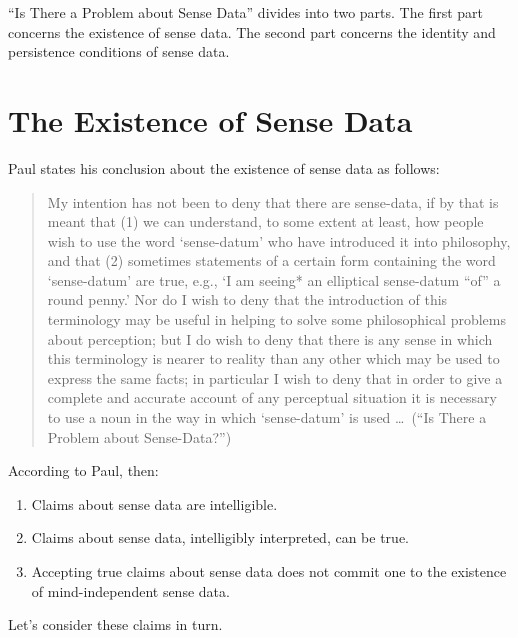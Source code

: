 \documentclass[11pt]{article}
\begin{document}



``Is There a Problem about Sense Data'' divides into two parts. The first part concerns the existence of sense data. The second part concerns the identity and persistence conditions of sense data.

\section{The Existence of Sense Data} %
\label{sec:the_existence_of_sense_data}

Paul states his conclusion about the existence of sense data as follows:
\begin{quote}
    My intention has not been to deny that there are sense-data, if by that is meant that (1) we can understand, to some extent at least, how people wish to use the word `sense-datum' who have introduced it into philosophy, and that (2) sometimes statements of a certain form containing the word `sense-datum' are true, e.g., `I am seeing* an elliptical sense-datum ``of'' a round penny.' Nor do I wish to deny that the introduction of this terminology may be useful in helping to solve some philosophical problems about perception; but I do wish to deny that there is any sense in which this terminology is nearer to reality than any other which may be used to express the same facts; in particular I wish to deny that in order to give a complete and accurate account of any perceptual situation it is necessary to use a noun in the way in which `sense-datum' is used \ldots\ (``Is There a Problem about Sense-Data?'')
\end{quote}
According to Paul, then: 
\begin{enumerate}
    \item Claims about sense data are intelligible.
    \item Claims about sense data, intelligibly interpreted, can be true.
    \item Accepting true claims about sense data does not commit one to the existence of mind-independent sense data.
\end{enumerate}
Let's consider these claims in turn.
\end{document}
